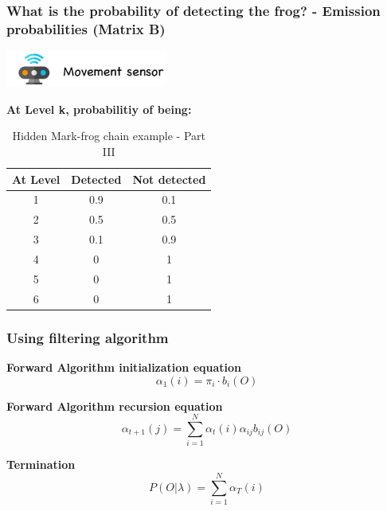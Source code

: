 \documentclass[xcolor=dvipsnames, compress]{beamer}
\begin{document}
\begin{frame}
\frametitle{What is the probability of detecting the frog? - Emission probabilities (Matrix B)}

\begin{center}
\includegraphics[width=0.4\textwidth]{images/sensor.png}
\end{center}

\begin{center}
	\textbf{At Level k, probabilitiy of being:}
\end{center}

\begin{center}
\begin{table}
\begin{centering}
\begin{tabular}{|c|c|c|}
\hline 
At Level & Detected & Not detected\tabularnewline
\hline 
\hline 
1 & 0.9 & 0.1\tabularnewline
\hline 
2 & 0.5 & 0.5\tabularnewline
\hline 
3 & 0.1 & 0.9\tabularnewline
\hline 
4 & 0 & 1\tabularnewline
\hline 
5 & 0 & 1\tabularnewline
\hline 
6 & 0 & 1\tabularnewline
\hline 
\end{tabular}
\par\end{centering}
\caption{Hidden Mark-frog chain example - Part III}
\end{table}
\par\end{center}
\end{frame}
%
%
\begin{frame}
\frametitle{Using filtering algorithm}
\textbf{Forward Algorithm initialization equation}
$$ \alpha_{1}(i) = \pi_i \cdot b_{i}(O) $$

\textbf{Forward Algorithm recursion equation}
$$ \alpha_{t+1}(j) = \sum_{i=1}^N \alpha_t(i) \alpha_{ij} b_{ij}(O) $$

\textbf{Termination}
$$ P(O|\lambda) = \sum_{i=1}^N \alpha_T(i)$$
\end{frame}
%
\end{document}
